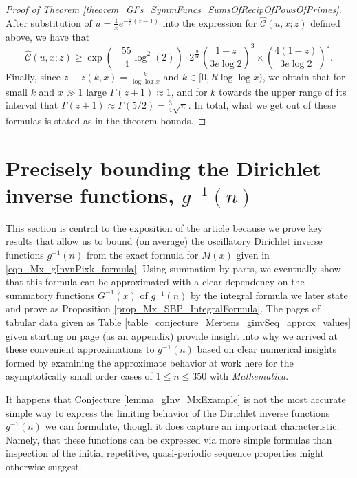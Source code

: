 \documentclass[11pt,reqno,a4letter]{article}
\numberwithin{figure}{section}
\numberwithin{table}{section}
\theoremstyle{plain}
\numberwithin{theorem}{section}
\theoremstyle{definition}
\begin{document}
\begin{proof}[Proof of Theorem \ref{theorem_GFs_SymmFuncs_SumsOfRecipOfPowsOfPrimes}]
After substitution of $u = \frac{1}{x} e^{-\frac{4}{3}(z-1)}$ into the expression for 
$\widehat{\mathcal{C}}(u, x; z)$ defined above, we have that 
\[
\widehat{\mathcal{C}}(u, x; z) \geq \exp\left(-\frac{55}{4} \log^2(2)\right) \cdot 2^{\frac{9}{16}} 
     \left(\frac{1-z}{3e\log 2}\right)^3 \times \left(\frac{4(1-z)}{3e\log 2}\right)^z. 
\]
Finally, since $z \equiv z(k, x) = \frac{k}{\log\log x}$ and $k \in [0, R\log\log x)$, we obtain that 
for small $k$ and $x \gg 1$ large $\Gamma(z+1) \approx 1$, and for $k$ towards the upper range of 
its interval that $\Gamma(z+1) \approx \Gamma(5/2) = \frac{3}{4} \sqrt{\pi}$. 
In total, what we get out of these formulas is stated as in the theorem bounds. 
\end{proof} 

\newpage
\section{Precisely bounding the Dirichlet inverse functions, $g^{-1}(n)$} 
\label{Section_InvFunc_PreciseExpsAndAsymptotics} 

This section is central to the exposition of the article because we prove key results that allow us to 
bound (on average) the oscillatory 
Dirichlet inverse functions $g^{-1}(n)$ from the exact formula for $M(x)$ given in 
\eqref{eqn_Mx_gInvnPixk_formula}. 
Using summation by parts, we eventually show that this formula can be approximated with a clear 
dependency on the summatory functions $G^{-1}(x)$ of $g^{-1}(n)$ by the integral formula we later 
state and prove as Proposition \ref{prop_Mx_SBP_IntegralFormula}. 
The pages of tabular data given as Table \ref{table_conjecture_Mertens_ginvSeq_approx_values} 
given starting on page \pageref{table_conjecture_Mertens_ginvSeq_approx_values} (as an appendix) 
provide insight into why we arrived at these convenient approximations to $g^{-1}(n)$ based on 
clear numerical insights formed by examining the approximate behavior 
at work here for the asymptotically 
small order cases of $1 \leq n \leq 350$ with \emph{Mathematica}. 

It happens that Conjecture \ref{lemma_gInv_MxExample} is not the most accurate 
simple way to express the limiting behavior of the 
Dirichlet inverse functions $g^{-1}(n)$ we can formulate, 
though it does capture an important characteristic. Namely, that these 
functions can be expressed via more simple formulas than inspection of the initial 
repetitive, quasi-periodic sequence properties might otherwise suggest. 
\end{document}

